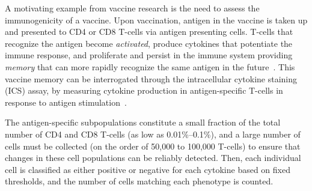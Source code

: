 \documentclass[12pt,oupdraft]{biostatistics}
\begin{document}
A motivating example from vaccine research is the need to assess the immunogenicity of a vaccine. Upon vaccination, antigen in the vaccine is taken up and presented to CD4 or CD8 T-cells via antigen presenting cells.
T-cells that recognize the antigen become \emph{activated}, produce cytokines that potentiate the immune response, and proliferate and persist in the immune system providing \emph{memory} that can more rapidly recognize the same antigen in the future~\citep{McKinstry:2010ei}. This vaccine memory can be interrogated through the intracellular cytokine staining (ICS) assay, by measuring cytokine production in antigen-specific T-cells in response to antigen stimulation~\citep{Horton:2007tsa,DeRosa:2004wp,Betts:2006dw}.

The antigen-specific subpopulations constitute a small fraction of the total number of CD4 and CD8 T-cells (as low as 0.01\%--0.1\%), 
and a large number of cells must be collected (on the order of 50,000 to 100,000 T-cells) to ensure that changes in these cell populations can be reliably detected.
Then, each individual cell is classified as either positive or negative for each cytokine based on fixed thresholds, and the number of cells matching each phenotype is counted.
\end{document}
